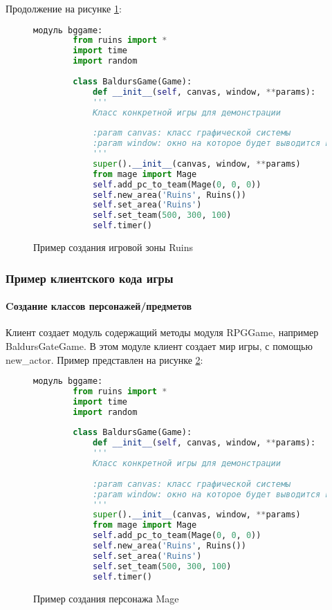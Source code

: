 Продолжение на рисунке \ref{ruins2:image}:
\begin{figure}[H]
	\begin{lstlisting}[language=Python]		
		модуль bggame:
		from ruins import *
		import time
		import random
		
		class BaldursGame(Game):
			def __init__(self, canvas, window, **params):
			'''
			Класс конкретной игры для демонстрации
		
			:param canvas: класс графической системы
			:param window: окно на которое будет выводится игра
			'''
			super().__init__(canvas, window, **params)
			from mage import Mage
			self.add_pc_to_team(Mage(0, 0, 0))
			self.new_area('Ruins', Ruins())
			self.set_area('Ruins')
			self.set_team(500, 300, 100)
			self.timer()
	\end{lstlisting}  
	\caption{Пример создания игровой зоны Ruins}
	\label{ruins2:image}
\end{figure}


\subsubsection{Пример клиентского кода игры}
\paragraph{Cоздание классов персонажей/предметов}
Клиент создает модуль содержащий методы модуля RPGGame, например BaldursGateGame. В этом модуле клиент создает мир игры, с помощью new\_actor.
Пример представлен на рисунке \ref{answer:image}:
\begin{figure}[H]
	\begin{lstlisting}[language=Python]
		модуль bggame:
		from ruins import *
		import time
		import random
		
		class BaldursGame(Game):
			def __init__(self, canvas, window, **params):
			'''
			Класс конкретной игры для демонстрации
		
			:param canvas: класс графической системы
			:param window: окно на которое будет выводится игра
			'''
			super().__init__(canvas, window, **params)
			from mage import Mage
			self.add_pc_to_team(Mage(0, 0, 0))
			self.new_area('Ruins', Ruins())
			self.set_area('Ruins')
			self.set_team(500, 300, 100)
			self.timer()
	\end{lstlisting}  
\caption{Пример создания персонажа Mage}
\label{answer:image}
\end{figure}


